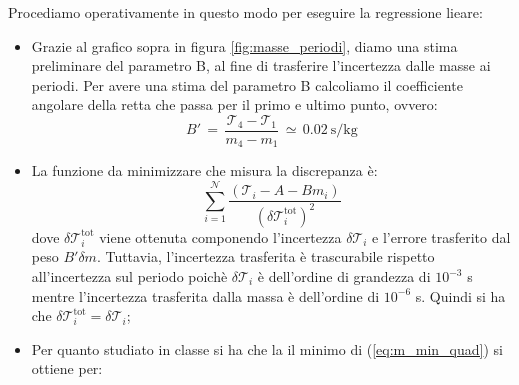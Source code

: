 
Procediamo operativamente in questo modo per eseguire la regressione lieare:

\begin{itemize}
	\item{Grazie al grafico sopra in figura \ref{fig:masse_periodi}, diamo una stima preliminare del parametro B, al fine di trasferire
        l'incertezza dalle masse ai periodi. Per avere una stima del parametro B calcoliamo il coefficiente angolare della retta che
        passa per il primo e ultimo punto, ovvero:
			\begin{equation*}
				B' \,=\, \frac{\mathcal{T}_4 - \mathcal{T}_1}{m_4 - m_1} \,\simeq\, \SI{0.02}{\second\per\kilo\gram}
			\end{equation*}
			}
	\item{La funzione da minimizzare che misura la discrepanza è:
			\begin{equation}
                \sum_{i=1}^{\mathcal{N}} \frac{(\mathcal{T}_i - A - B m_i)}{(\delta \mathcal{T}_i^\text{tot})^2}	
                \label{eq:m_min_quad}
			\end{equation}
            dove $\delta \mathcal{T}_i^\text{tot}$ viene ottenuta componendo
            l'incertezza $\delta \mathcal{T}_i$ e l'errore trasferito dal peso $B'\delta m$. Tuttavia, l'incertezza
            trasferita è trascurabile rispetto all'incertezza sul periodo poichè $\delta \mathcal{T}_i$ è dell'ordine di
            grandezza di $10^{-3}$ s mentre l'incertezza trasferita dalla massa è dell'ordine di $10^{-6}$ s.
            Quindi si ha che $\delta \mathcal{T}_i^\text{tot} = \delta \mathcal{T}_i$;}
	\item{Per quanto studiato in classe si ha che la il minimo di (\ref{eq:m_min_quad}) si ottiene per:

}
\end{itemize}
